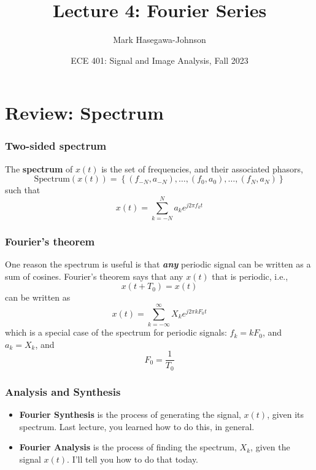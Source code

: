\documentclass{beamer}
\title{Lecture 4: Fourier Series}
\author{Mark Hasegawa-Johnson}
\date{ECE 401: Signal and Image Analysis, Fall 2023}
\begin{document}
\begin{frame}
  \maketitle
\end{frame}

\begin{frame}
  \tableofcontents
\end{frame}

\section[Review]{Review: Spectrum}
\setcounter{subsection}{1}

\begin{frame}
  \frametitle{Two-sided spectrum}

  The {\bf spectrum} of $x(t)$ is the set of frequencies, and their
  associated phasors,
  \[
  \mbox{Spectrum}\left( x(t) \right) =
  \left\{ (f_{-N},a_{-N}), \ldots, (f_0,a_0), \ldots, (f_N,a_N) \right\}
  \]
  such that
  \[
  x(t) = \sum_{k=-N}^N a_ke^{j2\pi f_kt}
  \]
\end{frame}

\begin{frame}
  \frametitle{Fourier's theorem}

  One reason the spectrum is useful is that {\bf\em any} periodic
  signal can be written as a sum of cosines.  Fourier's theorem says that
  any $x(t)$ that is periodic, i.e.,
  \[
  x(t+T_0) = x(t)
  \]
  can be written as
  \[
  x(t) = \sum_{k=-\infty}^\infty X_k e^{j2\pi k F_0 t}
  \]
  which is a special case of the spectrum for periodic signals:
  $f_k=kF_0$, and $a_k=X_k$, and
  \[
  F_0 = \frac{1}{T_0}
  \]
\end{frame}

\begin{frame}
  \frametitle{Analysis and Synthesis}

  \begin{itemize}
  \item {\bf Fourier Synthesis} is the process of generating the
    signal, $x(t)$, given its spectrum.  Last lecture, you learned
    how to do this, in general.
  \item {\bf Fourier Analysis} is the process of finding the spectrum,
    $X_k$, given the signal $x(t)$.  I'll tell you how to do that today.
  \end{itemize}
\end{frame}
\end{document}

